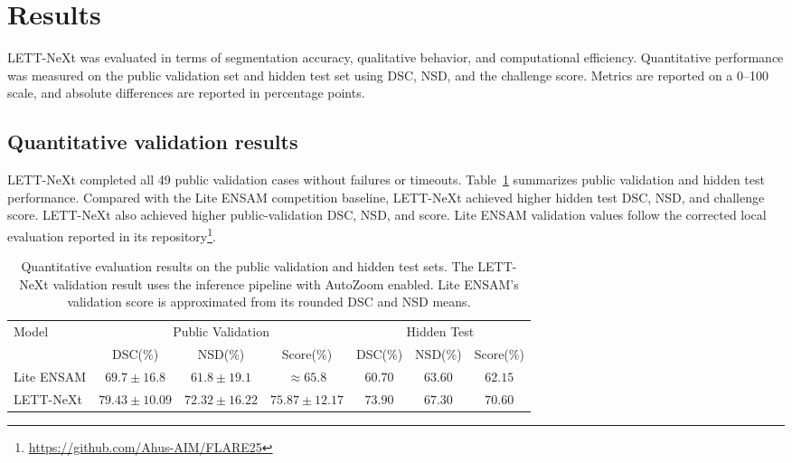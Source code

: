 \section{Results}
\label{sec:results}
LETT-NeXt was evaluated in terms of segmentation accuracy, qualitative behavior, and computational efficiency. 
Quantitative performance was measured on the public validation set and hidden test set using DSC, NSD, and the challenge score. Metrics are reported on a 0--100 scale, and absolute differences are reported in percentage points.


\subsection{Quantitative validation results}

LETT-NeXt completed all 49 public validation cases without failures or timeouts. 
Table~\ref{tab:final-results} summarizes public validation and hidden test performance. 
Compared with the Lite ENSAM competition baseline, LETT-NeXt achieved higher hidden test DSC, NSD, and challenge score. 
LETT-NeXt also achieved higher public-validation DSC, NSD, and score. Lite ENSAM validation values follow the corrected local evaluation reported in its repository\footnote{\url{https://github.com/Ahus-AIM/FLARE25}}.

\begin{table}[htbp]
\caption{Quantitative evaluation results on the public validation and hidden test sets. The LETT-NeXt validation result uses the inference pipeline with AutoZoom enabled. Lite ENSAM's validation score is approximated from its rounded DSC and NSD means.}
\label{tab:final-results}
\centering
\begin{adjustbox}{max width=\linewidth}
\begin{tabular}{lcccccc}
\toprule
\multirow{2}{*}{Model} & \multicolumn{3}{c}{Public Validation} & \multicolumn{3}{c}{Hidden Test} \\
\cmidrule(lr){2-4} \cmidrule(lr){5-7}
                         & DSC(\%) & NSD(\%) & Score(\%) & DSC(\%) & NSD(\%) & Score(\%) \\
\midrule
Lite ENSAM               & $69.7 \pm 16.8$ & $61.8 \pm 19.1$ & $\approx 65.8$            & $60.70$ & $63.60$ & $62.15$ \\
LETT-NeXt                & $79.43 \pm 10.09$ & $72.32 \pm 16.22$ & $75.87 \pm 12.17$ & $73.90$ & $67.30$ & $70.60$ \\
\bottomrule
\end{tabular}
\end{adjustbox}
\end{table}

